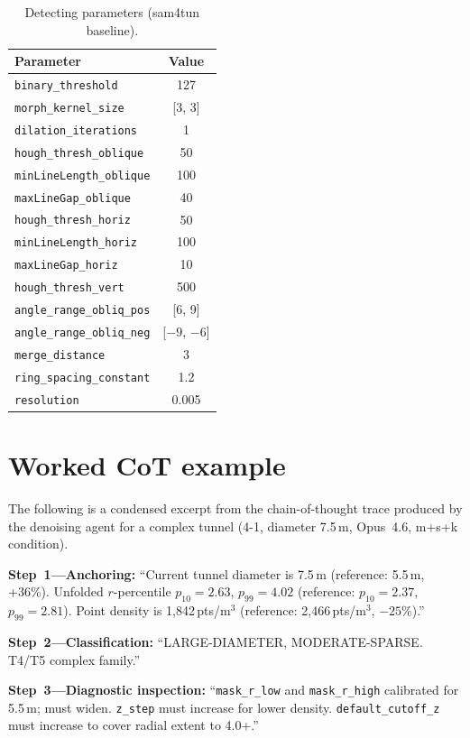 \documentclass[a4paper,fleqn]{cas-dc}
\begin{document}
\begin{table}[ht]
\caption{Detecting parameters (sam4tun baseline).}\label{tab:detect-params}
\begin{tabular*}{\tblwidth}{@{} l c @{}}
\toprule
Parameter & Value \\
\midrule
\texttt{binary\_threshold} & 127 \\
\texttt{morph\_kernel\_size} & [3, 3] \\
\texttt{dilation\_iterations} & 1 \\
\texttt{hough\_thresh\_oblique} & 50 \\
\texttt{minLineLength\_oblique} & 100 \\
\texttt{maxLineGap\_oblique} & 40 \\
\texttt{hough\_thresh\_horiz} & 50 \\
\texttt{minLineLength\_horiz} & 100 \\
\texttt{maxLineGap\_horiz} & 10 \\
\texttt{hough\_thresh\_vert} & 500 \\
\texttt{angle\_range\_obliq\_pos} & [6, 9] \\
\texttt{angle\_range\_obliq\_neg} & [$-9$, $-6$] \\
\texttt{merge\_distance} & 3 \\
\texttt{ring\_spacing\_constant} & 1.2 \\
\texttt{resolution} & 0.005 \\
\bottomrule
\end{tabular*}
\end{table}

\section{Worked CoT example}\label{app:cot}

The following is a condensed excerpt from the chain-of-thought trace produced by the denoising agent for a complex tunnel (4-1, diameter 7.5\,m, Opus~4.6, m+s+k condition).

\textbf{Step~1---Anchoring:}
``Current tunnel diameter is 7.5\,m (reference: 5.5\,m, +36\%). Unfolded $r$-percentile $p_{10} = 2.63$, $p_{99} = 4.02$ (reference: $p_{10} = 2.37$, $p_{99} = 2.81$). Point density is 1{,}842\,pts/m$^3$ (reference: 2{,}466\,pts/m$^3$, $-25$\%).''

\textbf{Step~2---Classification:}
``\textsf{LARGE-DIAMETER}, \textsf{MODERATE-SPARSE}. T4/T5 complex family.''

\textbf{Step~3---Diagnostic inspection:}
``\texttt{mask\_r\_low} and \texttt{mask\_r\_high} calibrated for 5.5\,m; must widen. \texttt{z\_step} must increase for lower density. \texttt{default\_cutoff\_z} must increase to cover radial extent to 4.0+.''
\end{document}

